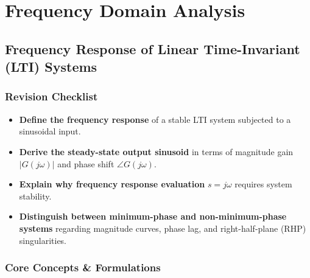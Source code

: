 \documentclass[12pt,onecolumn,twoside ]{article}
\begin{document}
	\newpage
	\section{Frequency Domain Analysis}

	\subsection{Frequency Response of Linear Time-Invariant (LTI) Systems}
	\subsubsection{Revision Checklist}
	\begin{itemize}
		\item[$\square$]
		\textbf{Define the frequency response} of a stable LTI system subjected to a sinusoidal input.
		\item[$\square$]
		\textbf{Derive the steady-state output sinusoid} in terms of magnitude gain $|G(j\omega)|$ and phase shift $\angle G(j\omega)$.
		\item[$\square$]
		\textbf{Explain why frequency response evaluation} $s = j\omega$ requires system stability.
		\item[$\square$]
		\textbf{Distinguish between minimum-phase and non-minimum-phase systems} regarding magnitude curves, phase lag, and right-half-plane (RHP) singularities.
	\end{itemize}
	
	\subsubsection{Core Concepts \& Formulations}
\end{document}

